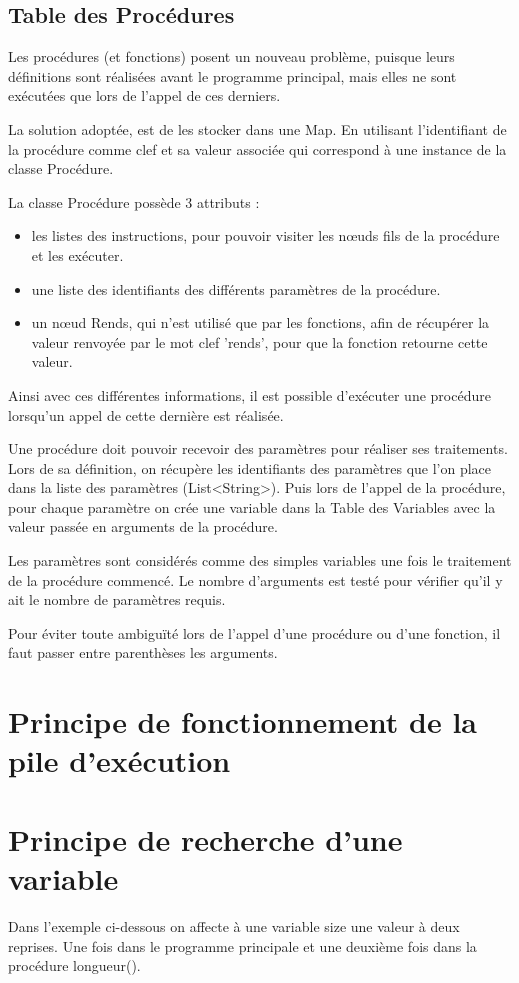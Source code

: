 \documentclass[a4paper,11pt]{article}
\begin{document}
\subsection{Table des Procédures}
Les procédures (et fonctions) posent un nouveau problème, puisque leurs définitions sont réalisées avant le programme principal, mais elles ne sont exécutées que lors de l'appel de ces derniers.

La solution adoptée, est de les stocker dans une Map. En utilisant l'identifiant de la procédure comme clef et sa valeur associée qui correspond à une instance de la classe Procédure.

La classe Procédure possède 3 attributs :
\begin{itemize}
\item les listes des instructions, pour pouvoir visiter les nœuds fils de la procédure et les exécuter.
\item une liste des identifiants des différents paramètres de la procédure.   
\item un nœud Rends, qui n'est utilisé que par les fonctions, afin de récupérer la valeur renvoyée par le mot clef 'rends', pour que la fonction retourne cette valeur.
\end{itemize} 


Ainsi avec ces différentes informations, il est possible d'exécuter une procédure lorsqu'un appel de cette dernière est réalisée.

Une procédure doit pouvoir recevoir des paramètres pour réaliser ses traitements.
Lors de sa définition, on récupère les identifiants des paramètres que l'on place dans la liste des paramètres (List<String>). 
Puis lors de l'appel de la procédure, pour chaque paramètre on crée une variable dans la Table des Variables avec la valeur passée en arguments de la procédure. 

Les paramètres sont considérés comme des simples variables une fois le traitement de la procédure commencé.
Le nombre d'arguments est testé pour vérifier qu'il y ait le nombre de paramètres requis.

Pour éviter toute ambiguïté lors de l'appel d'une procédure ou d'une fonction, il faut passer entre parenthèses les arguments.  

\section{Principe de fonctionnement de la pile d'exécution}

\section{Principe de recherche d'une variable}
Dans l'exemple ci-dessous on affecte à une variable size une valeur à deux reprises. Une fois dans le programme principale et une deuxième fois dans la procédure longueur().
\end{document}
